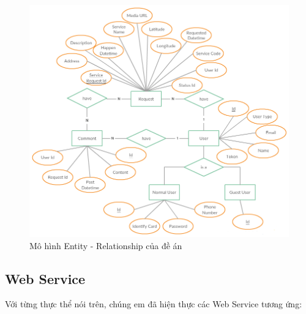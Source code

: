 \documentclass[a4paper]{article}
\begin{document}
\begin{center}
    \begin{figure}[h]
    \begin{center}
     \includegraphics[scale=.65]{entity-diagram.png}
    \end{center}
    \caption{Mô hình Entity - Relationship của đề án}
    \label{refhinh1}
    \end{figure}
\end{center}

\newpage

\subsection{Web Service}
Với từng thực thể nói trên, chúng em đã hiện thực các Web Service tương ứng:
\newpage
\end{document}
